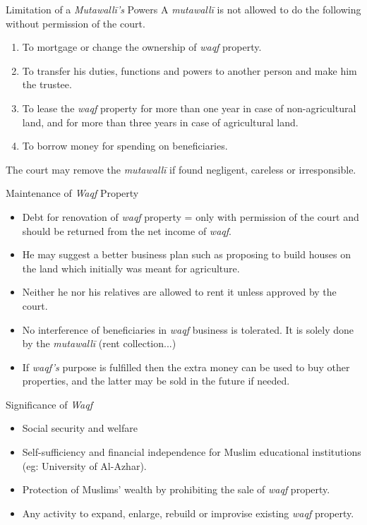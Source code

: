 \begin{frame}{Limitation of a \textit{Mutawallī's} Powers}
A \textit{mutawallī} is not allowed to do the following without permission of the court.
\begin{enumerate}
\item To mortgage or change the ownership of \textit{waqf} property.
\item To transfer his duties, functions and powers to another person and make him the trustee.
\item To lease the \textit{waqf} property for more than one year in case of non-agricultural land, and for more than three years in case of agricultural land.
\item To borrow money for spending on beneficiaries.
\end{enumerate}

The court may remove the \textit{mutawallī} if found negligent, careless or irresponsible. 
\end{frame}

\begin{frame}{Maintenance of \textit{Waqf} Property}
\begin{itemize}
\item Debt for renovation of \textit{waqf} property = only with permission of the court and should be returned from the net income of \textit{waqf}.
\item He may suggest a better business plan such as proposing to build houses on the land which initially was meant for agriculture.
\item Neither he nor his relatives are allowed to rent it unless approved by the court.
\item No interference of beneficiaries in \textit{waqf} business is tolerated. It is solely done by the \textit{mutawallī} (rent collection...)
\item If \textit{waqf's} purpose is fulfilled then the extra money can be used to buy other properties, and the latter may be sold in the future if needed.
\end{itemize}
\end{frame}

\begin{frame}{Significance of \textit{Waqf}}
\begin{itemize}
\item Social security and welfare
\item Self-sufficiency and financial independence for Muslim educational institutions (eg: University of Al-Azhar).
\item Protection of Muslims' wealth by prohibiting the sale of \textit{waqf} property.
\item Any activity to expand, enlarge, rebuild or improvise existing \textit{waqf} property.
\end{itemize}
\end{frame}

